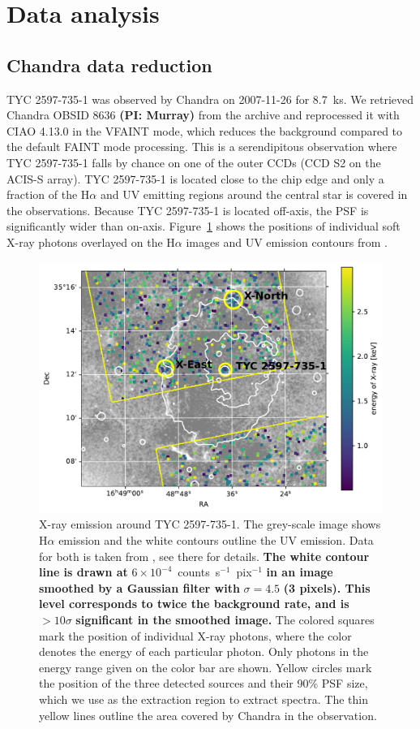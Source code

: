 \documentclass[linenumbers]{aastex631}
\begin{document}
\section{Data analysis} \label{sec:data}
\subsection{Chandra data reduction}
TYC 2597-735-1 was observed by Chandra on 2007-11-26 for 8.7~ks.
We retrieved Chandra OBSID 8636 \textbf{(PI: Murray)} from  the archive and reprocessed it with CIAO 4.13.0 \citep{2006SPIE.6270E..1VF} in the VFAINT mode, which reduces the background compared to the default FAINT mode processing. This is a serendipitous observation where TYC 2597-735-1 falls by chance on one of the outer CCDs (CCD S2 on the ACIS-S array). TYC 2597-735-1 is located close to the chip edge and only a fraction of the H$\alpha$ and UV emitting regions around the central star is covered in the observations. Because TYC 2597-735-1 is located off-axis, the PSF is significantly wider than on-axis. Figure~\ref{fig:chandraimage} shows the positions of individual soft X-ray photons overlayed on the H$\alpha$ images and UV emission contours from \citet{2020Natur.587..387H}.
\begin{figure}
    \centering
    \includegraphics[width=\textwidth]{chandraimage.pdf}
\caption{X-ray emission around TYC 2597-735-1. The grey-scale image shows H$\alpha$ emission and the white contours outline the UV emission. Data for both is taken from \citet{2020Natur.587..387H}, see there for details. \textbf{The white contour line is drawn at} $6\times 10^{-4}$~counts~s$^{-1}$~pix$^{-1}$ \textbf{in an image smoothed by a Gaussian filter with} $\sigma=4.5$\arcsec{} \textbf{(3 pixels). This level corresponds to twice the background rate, and is} $>10\sigma$ \textbf{significant in the smoothed image.}
    The colored squares mark the position of individual X-ray photons, where the color denotes the energy of each particular photon. Only photons in the energy range given on the color bar are shown. Yellow circles mark the position of the three detected sources and their 90\% PSF size, which we use as the extraction region to extract spectra. The thin yellow lines outline the area covered by Chandra in the observation.}
    \label{fig:chandraimage}
\end{figure}
\end{document}
